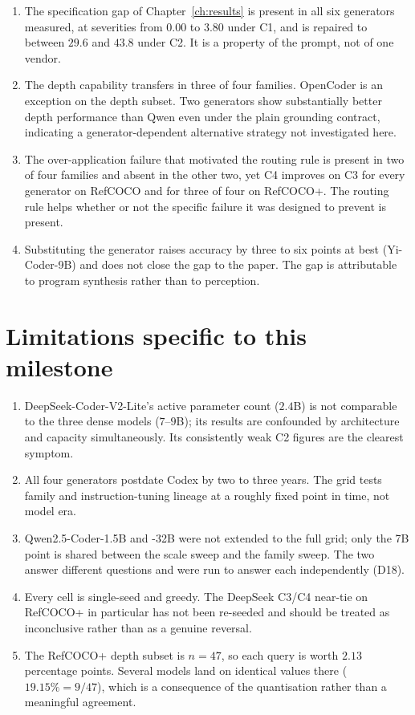 \begin{enumerate}[leftmargin=1.8em, itemsep=4pt]
\item The specification gap of Chapter~\ref{ch:results} is present in all six
generators measured, at severities from $0.00$ to $3.80$ under C1, and is repaired to
between $29.6$ and $43.8$ under C2. It is a property of the prompt, not of one vendor.

\item The depth capability transfers in three of four families. OpenCoder is an
exception on the depth subset. Two generators show substantially better depth
performance than Qwen even under the plain grounding contract, indicating a
generator-dependent alternative strategy not investigated here.

\item The over-application failure that motivated the routing rule is present in two
of four families and absent in the other two, yet C4 improves on C3 for every
generator on RefCOCO and for three of four on RefCOCO+. The routing rule helps whether
or not the specific failure it was designed to prevent is present.

\item Substituting the generator raises accuracy by three to six points at best
(Yi-Coder-9B) and does not close the gap to the paper. The gap is attributable to
program synthesis rather than to perception.
\end{enumerate}

\section{Limitations specific to this milestone}

\begin{enumerate}[leftmargin=1.6em, itemsep=3pt]
\item DeepSeek-Coder-V2-Lite's active parameter count ($2.4$B) is not comparable to
the three dense models ($7$--$9$B); its results are confounded by architecture and
capacity simultaneously. Its consistently weak C2 figures are the clearest symptom.

\item All four generators postdate Codex by two to three years. The grid tests family
and instruction-tuning lineage at a roughly fixed point in time, not model era.

\item Qwen2.5-Coder-1.5B and -32B were not extended to the full grid; only the 7B
point is shared between the scale sweep and the family sweep. The two answer different
questions and were run to answer each independently (D18).

\item Every cell is single-seed and greedy. The DeepSeek C3/C4 near-tie on RefCOCO+
in particular has not been re-seeded and should be treated as inconclusive rather than
as a genuine reversal.

\item The RefCOCO+ depth subset is $n=47$, so each query is worth $2.13$ percentage
points. Several models land on identical values there ($19.15\% = 9/47$), which is a
consequence of the quantisation rather than a meaningful agreement.
\end{enumerate}
